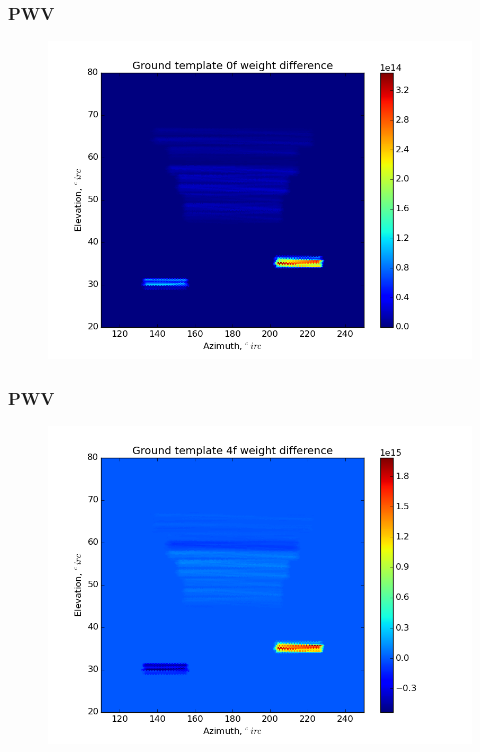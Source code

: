 \documentclass{beamer}
\begin{document}
\begin{frame}
\frametitle{PWV}
\begin{figure}
\includegraphics[width=0.9\linewidth]{dw0_gt_PWV.png}
\end{figure}
\end{frame}

\begin{frame}
\frametitle{PWV}
\begin{figure}
\includegraphics[width=0.9\linewidth]{dw4_gt_PWV.png}
\end{figure}
\end{frame}
\end{document}

